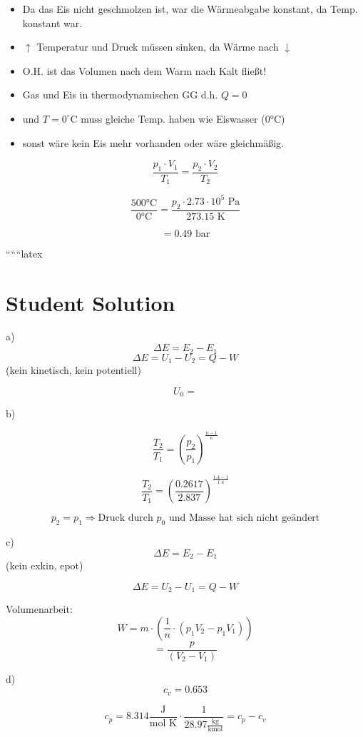 \begin{itemize}
    \item Da das Eis nicht geschmolzen ist, war die Wärmeabgabe konstant, da Temp. konstant war.
    \item $\uparrow$ Temperatur und Druck müssen sinken, da Wärme nach $\downarrow$
    \item O.H. ist das Volumen nach dem Warm nach Kalt fließt!
    \item Gas und Eis in thermodynamischen GG d.h. $Q = 0$
    \item und $T = 0^\circ \text{C}$ muss gleiche Temp. haben wie Eiswasser (0°C)
    \item sonst wäre kein Eis mehr vorhanden oder wäre gleichmäßig.
\end{itemize}

\[
\frac{p_1 \cdot V_1}{T_1} = \frac{p_2 \cdot V_2}{T_2}
\]

\[
\frac{500 \text{°C}}{0 \text{°C}} = \frac{p_2 \cdot 2.73 \cdot 10^5 \text{ Pa}}{273.15 \text{ K}}
\]

\[
= 0.49 \text{ bar}
\]

``````latex


\section*{Student Solution}

a) 
\[
\Delta E = E_2 - E_1
\]
\[
\Delta E = U_1 - U_2 = Q - W
\]
(kein kinetisch, kein potentiell)

\[
U_0 =
\]

b) 

\[
\frac{T_2}{T_1} = \left( \frac{p_2}{p_1} \right)^{\frac{\kappa - 1}{\kappa}}
\]

\[
\frac{T_2}{T_1} = \left( \frac{0.2617}{2.837} \right)^{\frac{1.4 - 1}{1.4}}
\]

\[
p_2 = p_1 \Rightarrow \text{Druck durch } p_0 \text{ und Masse hat sich nicht geändert}
\]

c) 
\[
\Delta E = E_2 - E_1
\]
(kein exkin, epot)

\[
\Delta E = U_2 - U_1 = Q - W
\]

Volumenarbeit:
\[
W = m \cdot \left( \frac{1}{n} \cdot (p_1 V_2 - p_1 V_1) \right)
\]
\[
= \frac{p}{(V_2 - V_1)}
\]

d) 
\[
c_v = 0.653
\]

\[
c_p = 8.314 \frac{\text{J}}{\text{mol K}} \cdot \frac{1}{28.97 \frac{\text{kg}}{\text{kmol}}} = c_p - c_v
\]

